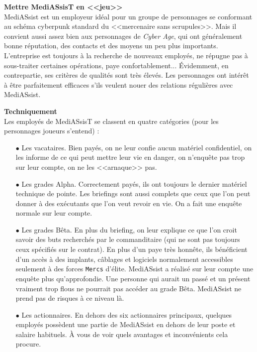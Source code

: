 \documentclass[11pt,twoside,a4paper]{article}
\begin{document}
\begin{multicols}{2}
\textbf{\Large Mettre MediASsisT en <<jeu>>}~\\
MediASsist est un employeur id{\'e}al pour un groupe de personnages se conformant au sch{\'e}ma	cyberpunk standard du <<mercenaire sans scrupules>>. Mais il convient aussi assez bien aux personnages de \emph{Cyber Age}, qui ont g{\'e}n{\'e}ralement bonne r{\'e}putation, des contacts et des moyens un peu plus importants. L'entreprise est toujours {\`a} la recherche de nouveaux employ{\'e}s, ne r{\'e}pugne pas {\`a} sous-traiter certaines op{\'e}rations, paye confortablement... {\'E}videmment, en contrepartie, ses crit{\`e}res de qualit{\'e}s sont tr{\`e}s {\'e}lev{\'e}s. Les personnages ont int{\'e}r{\^e}t {\`a} {\^e}tre parfaitement efficaces s'ils veulent nouer des relations r{\'e}guli{\`e}res avec MediASsist. ~\\

\vfill
\columnbreak

\textbf{\large Techniquement}~\\
Les employ{\'e}s de MediASsisT se classent en quatre cat{\'e}gories (pour les personnages joueurs s'entend) : 
\begin{itemize}
	\item[$\bullet$] Les vacataires. Bien pay{\'e}s, on ne leur confie aucun mat{\'e}riel confidentiel, on les informe de ce qui peut mettre leur vie en danger, on n'enqu{\^e}te pas trop sur leur compte, on ne les <<arnaque>> pas. 
	\item[$\bullet$] Les grades Alpha. Correctement pay{\'e}s, ils ont toujours le dernier mat{\'e}riel technique de pointe. Les briefings sont aussi complets que ceux que l'on peut donner {\`a} des ex{\'e}cutants que l'on veut revoir en vie. On a fait une enqu{\^e}te normale sur leur compte. 
	\item[$\bullet$] Les grades B{\^e}ta. En plus du briefing, on leur explique ce que l'on croit savoir des buts recherch{\'e}s par le commanditaire (qui ne sont pas toujours ceux sp{\'e}cifi{\'e}s sur le contrat). En plus d'un paye tr{\`e}s honn{\^e}te, ils b{\'e}n{\'e}ficient d'un acc{\`e}s {\`a} des implants, c{\^a}blages et logiciels normalement accessibles seulement {\`a} des forces \texttt{Mercs} d'{\'e}lite. MediASsist a r{\'e}alis{\'e} sur leur compte une enqu{\^e}te plus qu'approfondie. Une personne qui aurait un pass{\'e} et un pr{\'e}sent vraiment trop flous ne pourrait pas acc{\'e}der au grade B{\^e}ta. MediASsist ne prend pas de risques {\`a} ce niveau l{\`a}. 
	\item[$\bullet$] Les actionnaires. En dehors des six actionnaires principaux, quelques employ{\'e}s poss{\`e}dent une partie de MediASsist en dehors de leur poste et salaire habituels. {\`A} vous de voir quels avantages et inconv{\'e}nients cela procure.  
\end{itemize}~\\


\end{multicols}
\end{document}

